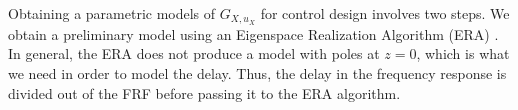 \documentclass[journal,twocolumn,twoside]{IEEEtran}
\begin{document}


Obtaining a parametric models of $G_{X,u_X}$ for control design involves two steps. We obtain a preliminary model using an Eigenspace Realization Algorithm (ERA) \cite{Jacques_sysidfrf}. In general, the ERA does not produce a model with poles at $z=0$, which is what we need in order to model the delay. Thus, the delay in the frequency response is divided out of the FRF before passing it to the ERA algorithm.
\end{document}
